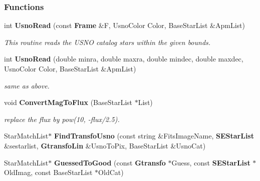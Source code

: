\subsubsection*{Functions}
\begin{CompactItemize}
\item 
int {\bf Usno\-Read} (const {\bf Frame} \&F, Usno\-Color Color, Base\-Star\-List \&Apm\-List)
\begin{CompactList}\small\item\em This routine reads the USNO catalog stars within the given bounds.\item\end{CompactList}\item 
{}
int {\bf Usno\-Read} (double minra, double maxra, double mindec, double maxdec, Usno\-Color Color, Base\-Star\-List \&Apm\-List)\label{usnoutils_h_a3}

\begin{CompactList}\small\item\em same as above.\item\end{CompactList}\item 
{}
void {\bf Convert\-Mag\-To\-Flux} (Base\-Star\-List $\ast$List)\label{usnoutils_h_a4}

\begin{CompactList}\small\item\em replace the flux by pow(10, -flux/2.5).\item\end{CompactList}\item 
{}
Star\-Match\-List$\ast$ {\bf Find\-Transfo\-Usno} (const string \&Fits\-Image\-Name, {\bf SEStar\-List} \&sestarlist, {\bf Gtransfo\-Lin} \&Usno\-To\-Pix, Base\-Star\-List \&Usno\-Cat)\label{usnoutils_h_a5}

\item 
{}
Star\-Match\-List$\ast$ {\bf Guessed\-To\-Good} (const {\bf Gtransfo} $\ast$Guess, const {\bf SEStar\-List} $\ast$Old\-Imag, const Base\-Star\-List $\ast$Old\-Cat)\label{usnoutils_h_a6}


\end{CompactItemize}
